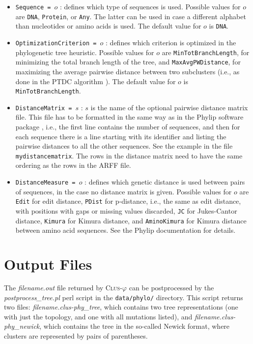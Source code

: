 \documentclass[a4paper]{report}
\newcommand{\clusphy}{\textsc{Clus}-$\varphi$}
\begin{document}
\begin{itemize}
\item {\tt Sequence = $o$} : defines which type of sequences is used. Possible values for $o$ are {\tt DNA}, {\tt Protein}, or {\tt Any}. The latter can be used in case a different alphabet than nucleotides or amino acids is used. The default value for $o$ is {\tt DNA}.
\item {\tt OptimizationCriterion = $o$} : defines which criterion is optimized in the phylogenetic tree heuristic. Possible values for $o$ are {\tt MinTotBranchLength}, for minimizing the total branch length of the tree, and {\tt MaxAvgPWDistance}, for maximizing the average pairwise distance between two subclusters (i.e., as done in the PTDC algorithm \cite{Arslan07:proc}). The default value for $o$ is {\tt MinTotBranchLength}.
\item {\tt DistanceMatrix = $s$} : $s$ is the name of the optional pairwise distance matrix file. This file has to be formatted in the same way as in the Phylip software package \cite{Phylip3.6-08:misc}, i.e., the first line contains the number of sequences, and then for each sequence there is a line starting with its identifier and listing the pairwise distances to all the other sequences. See the example in the file \texttt{mydistancematrix}. The rows in the distance matrix need to have the same ordering as the rows in the ARFF file.
\item {\tt DistanceMeasure = $o$} : defines which genetic distance is used between pairs of sequences, in the case no distance matrix is given. Possible values for $o$ are {\tt Edit} for edit distance, {\tt PDist} for p-distance, i.e., the same as edit distance, with positions with gaps or missing values discarded, {\tt JC} for Jukes-Cantor distance, {\tt Kimura} for Kimura distance, and {\tt AminoKimura} for Kimura distance between amino acid sequences. See the Phylip documentation \cite{Phylip3.6-08:misc} for details.
\end{itemize}

\section{Output Files}
The \emph{filename.out} file returned by \clusphy{} can be postprocessed by the \emph{postprocess\_tree.pl} perl script in the {\tt data/phylo/} directory. This script returns two files: \emph{filename.clus-phy\_tree}, which contains two tree representations (one with just the topology, and one with all mutations listed), and \emph{filename.clus-phy\_newick}, which contains the tree in the so-called Newick format, where clusters are represented by pairs of parentheses.




\end{document}
